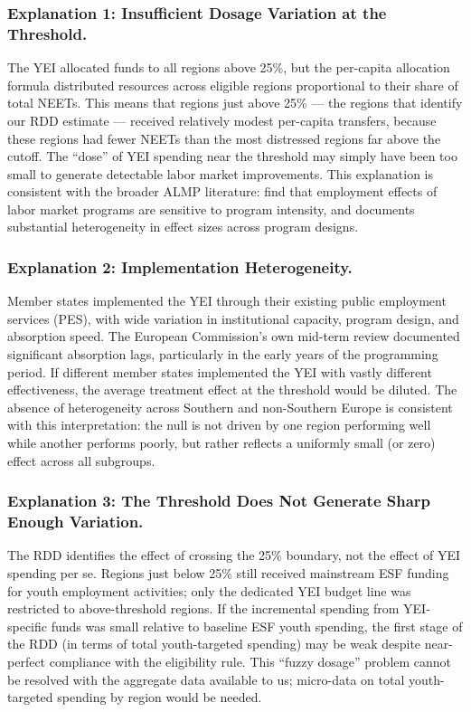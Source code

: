 \documentclass[12pt]{article}
\begin{document}
\subsubsection*{Explanation 1: Insufficient Dosage Variation at the Threshold.} The YEI allocated funds to all regions above 25\%, but the per-capita allocation formula distributed resources across eligible regions proportional to their share of total NEETs. This means that regions just above 25\% --- the regions that identify our RDD estimate --- received relatively modest per-capita transfers, because these regions had fewer NEETs than the most distressed regions far above the cutoff. The ``dose'' of YEI spending near the threshold may simply have been too small to generate detectable labor market improvements. This explanation is consistent with the broader ALMP literature: \citet{card2018works} find that employment effects of labor market programs are sensitive to program intensity, and \citet{kluve2010effectiveness} documents substantial heterogeneity in effect sizes across program designs.

\subsubsection*{Explanation 2: Implementation Heterogeneity.} Member states implemented the YEI through their existing public employment services (PES), with wide variation in institutional capacity, program design, and absorption speed. The European Commission's own mid-term review documented significant absorption lags, particularly in the early years of the programming period. If different member states implemented the YEI with vastly different effectiveness, the average treatment effect at the threshold would be diluted. The absence of heterogeneity across Southern and non-Southern Europe is consistent with this interpretation: the null is not driven by one region performing well while another performs poorly, but rather reflects a uniformly small (or zero) effect across all subgroups.

\subsubsection*{Explanation 3: The Threshold Does Not Generate Sharp Enough Variation.} The RDD identifies the effect of crossing the 25\% boundary, not the effect of YEI spending per se. Regions just below 25\% still received mainstream ESF funding for youth employment activities; only the dedicated YEI budget line was restricted to above-threshold regions. If the incremental spending from YEI-specific funds was small relative to baseline ESF youth spending, the first stage of the RDD (in terms of total youth-targeted spending) may be weak despite near-perfect compliance with the eligibility rule. This ``fuzzy dosage'' problem cannot be resolved with the aggregate data available to us; micro-data on total youth-targeted spending by region would be needed.
\end{document}
